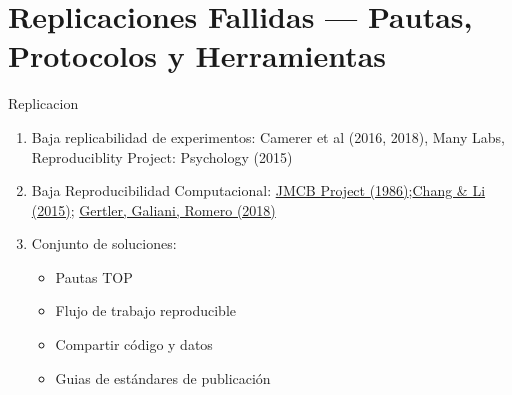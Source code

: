 \documentclass{beamer}
\begin{document}
\section[Replicaciones Fallidas]{Replicaciones Fallidas --- Pautas, Protocolos y Herramientas}
\begin{frame}{Replicacion}
\begin{enumerate}[<.->]
 \item Baja replicabilidad de experimentos: Camerer et al (2016, 2018), Many Labs, Reproduciblity Project: Psychology (2015) 
 \item Baja Reproducibilidad Computacional: \href{http://www.jstor.org/stable/1806061}{JMCB Project (1986)};\href{ADDD LINK}{Chang \& Li (2015)};  \href{https://www.nature.com/articles/d41586-018-02108-9}{Gertler, Galiani, Romero (2018)}
\item Conjunto de soluciones:
\begin{itemize}
\item Pautas TOP
 \item Flujo de trabajo reproducible
 \item Compartir código y datos
 \item Guias de estándares de publicación 
\end{itemize}
  \end{enumerate}
\end{frame}
\end{document}
